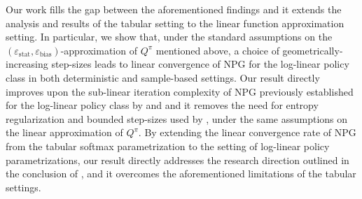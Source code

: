 \documentclass[a4paper,12pt]{article}
\numberwithin{theorem}{section}
\newcommand\A{\mathcal{A}}
\renewcommand\S{\mathcal{S}}
\newcommand\1{\mathbf{1}}
\newcommand{\norm}[1]{\left\lVert #1 \right\rVert}
\begin{document}
Our work fills the gap between the aforementioned findings and it extends the analysis and results of the tabular setting to the linear function approximation setting. In particular, we show that, under the standard assumptions on the $(\varepsilon_\text{stat},\varepsilon_\text{bias})$-approximation of $Q^\pi$ mentioned above, a choice of geometrically-increasing step-sizes leads to linear convergence of NPG for the log-linear policy class in both deterministic and sample-based settings. Our result directly improves upon the sub-linear iteration complexity of NPG previously established for the log-linear policy class by \cite{RN265} and \cite{RN279} and it removes the need for entropy regularization and bounded step-sizes used by \cite{RN280}, under the same assumptions on the linear approximation of $Q^\pi$. %
By extending the linear convergence rate of NPG from the tabular softmax parametrization to the setting of log-linear policy parametrizations, our result directly addresses the research direction outlined in the conclusion of \cite{RN266}, and it overcomes the aforementioned limitations of the tabular settings.

\end{document}

